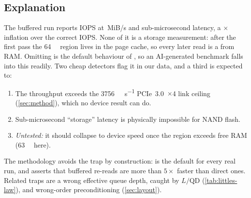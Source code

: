 \subsection{Explanation}
\csvget{}\csvget{}%
The buffered run reports  IOPS at
\,MiB/s and sub-microsecond latency, a
\ssdratio[0]{\ssdBuf}{\ssdDir}$\times$ inflation over the correct
 IOPS. None of it is a storage measurement: after the first pass the
\qty{64}{\mebi\byte} region lives in the page cache, so every later read is a  from RAM. Omitting  is the default behaviour of , so an AI-generated benchmark falls into
this readily. Two cheap detectors flag it in our data, and a third is expected to:
\begin{enumerate}
  \item The throughput exceeds the \qty{3756}{\mebi\byte\per\second} PCIe~3.0~$\times$4 link ceiling
        (\cref{sec:method}), which no device result can do.
  \item Sub-microsecond \enquote{storage} latency is physically impossible for NAND flash.
  \item \emph{Untested:} it should collapse to device speed once the region exceeds free RAM
        (\qty{63}{\gibi\byte} here).
\end{enumerate}
The methodology avoids the trap by construction:  is the default for every real run, and
 asserts that buffered re-reads are more than $5\times$ faster than direct ones. Related
traps are a wrong effective queue depth, caught by $L/\text{QD}$ (\cref{tab:littles-law}), and
wrong-order preconditioning (\cref{sec:layout}).
